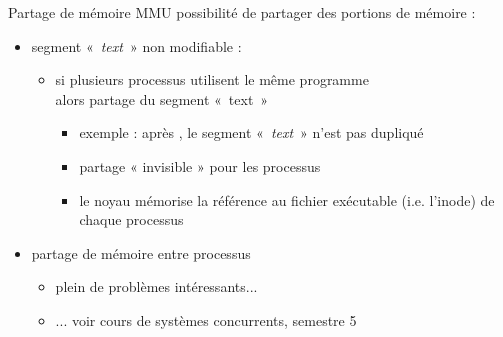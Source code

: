 \begin {frame} {Partage de mémoire}
    MMU \implique possibilité de partager des portions de mémoire :

    \begin {itemize}
	\item segment «~\textit {text}~» non modifiable :
	    \begin {itemize}
		\item si plusieurs processus utilisent le même programme
		    \\
		    alors partage du segment «~text~»

		    \begin {itemize}
			\item exemple : après , le segment
			    «~\textit {text}~» n'est pas dupliqué
			\item partage « invisible » pour les processus
			\item le noyau mémorise la référence au
			    fichier exécutable (i.e. l'inode) de
			    chaque processus
		    \end {itemize}
		\end {itemize}

	\item partage de mémoire entre processus
	    \begin {itemize}
		\item plein de problèmes intéressants...
		\item ... voir cours de systèmes concurrents, semestre 5
	    \end {itemize}
    \end {itemize}
\end {frame}




